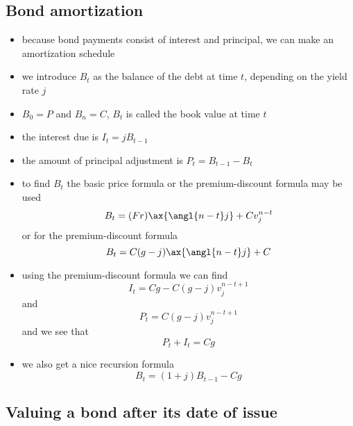 \documentclass[../00_main.tex]{subfiles}
\begin{document}
\subsection{Bond amortization}

\begin{itemize}
    \item because bond payments consist of interest and principal, we can make
        an amortization schedule
    \item we introduce $B_t$ as the balance of the debt at time $t$, depending
        on the yield rate $j$
    \item $B_0 = P$ and $B_n = C$, $B_t$ is called the book value at time $t$
    \item the interest due is $I_t = jB_{t-1}$
    \item the amount of principal adjustment is $P_t = B_{t-1} - B_t$
    \item to find $B_t$ the basic price formula or the premium-discount formula
        may be used
        \begin{equation}\nonumber
            B_t = (Fr) \ax{\angl{n-t} j} + Cv_j^{n-t}
        \end{equation}
        or for the premium-discount formula
        \begin{equation}\nonumber
            B_t = C(g-j) \ax{\angl{n-t} j} + C
        \end{equation}
    \item using the premium-discount formula we can find
        \begin{equation}\nonumber
            I_t = Cg - C(g - j)v_j^{n-t+1}
        \end{equation}
        and
        \begin{equation}\nonumber
            P_t = C(g - j)v_j^{n-t+1}
        \end{equation}
        and we see that
        \begin{equation}\nonumber
            P_t + I_t = Cg
        \end{equation}
    \item we also get a nice recursion formula
        \begin{equation}\nonumber
            B_t = (1 + j) B_{t-1} - Cg
        \end{equation}
\end{itemize}

\subsection{Valuing a bond after its date of issue}
\end{document}
